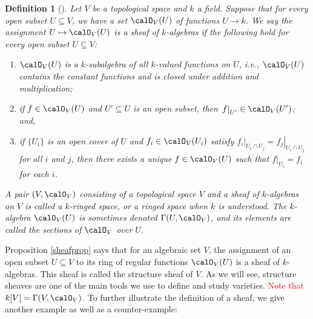 \documentclass[12pt]{amsart}
\theoremstyle{plain}
\newtheorem{definition}[theorem]{Definition}
\begin{document}
\begin{definition}[{\cite[Chapter 3, a.]{Milne13}}]\label{sheafdef}
Let $V$ be a topological space and $k$ a field.
Suppose that for every open subset $U \subseteq V$, we have a set $\calO_V(U)$ of functions $U \to k$.
We say the assignment $U \mapsto \calO_V(U)$ is a sheaf of $k$-algebras if the following hold for every open subset $U \subseteq V$:
\begin{enumerate}
\item
$\calO_V(U)$ is a $k$-subalgebra of all $k$-valued functions on $U$, i.e., $\calO_V(U)$ contains the constant functions and is closed under addition and multiplication;
\item
if $f \in \calO_V(U)$ and $U'\subseteq U$ is an open subset, then $\left. f \right|_{U'} \in \calO_V(U')$; and,
\item
if $\{U_i\}$ is an open cover of $U$ and $f_i \in \calO_V(U_i)$ satisfy $\left. f_i \right|_{U_i \cap U_j} = \left. f_j \right|_{U_i \cap U_j}$ for all $i$ and $j$, then there exists a unique $f \in \calO_V(U)$ such that $\left. f\right|_{U_i} = f_i$ for each $i$.
\end{enumerate}
A pair $(V, \calO_V)$ consisting of a topological space $V$ and a sheaf of $k$-algebras on $V$ is called a $k$-ringed space, or a ringed space when $k$ is understood.
The $k$-algebra $\calO_V(U)$ is sometimes denoted $\Gamma(U, \calO_V)$, and its elements are called the sections of $\calO_V$ over $U$.
\end{definition}

Proposition \ref{sheafprop} says that for an algebraic set $V$, the assignment of an open subset $U \subseteq V$ to its ring of regular functions $\calO_V(U)$ is a sheaf of $k$-algebras.
This sheaf is called the structure sheaf of $V$.
As we will see, structure sheaves are one of the main tools we use to define and study varieties.
\textcolor{red}{Note that $k[V] = \Gamma(V, \calO_V)$.}
To further illustrate the definition of a sheaf, we give another example as well as a counter-example:
\end{document}
